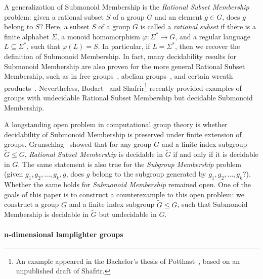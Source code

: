 \documentclass[a4paper,UKenglish,cleveref, autoref, thm-restate]{lipics-v2021}
\theoremstyle{definition}
\theoremstyle{definition}
\theoremstyle{definition}
\begin{document}
A generalization of Submonoid Membership is the \emph{Rational Subset Membership} problem: given a rational subset $S$ of a group $G$ and an element $g \in G$, does $g$ belong to $S$?
Here, a subset $S$ of a group $G$ is called a \emph{rational subset} if there is a finite alphabet $\Sigma$, a monoid homomorphism $\varphi \colon \Sigma^* \rightarrow G$, and a regular language $L \subseteq \Sigma^*$, such that $\varphi(L) = S$.
In particular, if $L = \Sigma^*$, then we recover the definition of Submonoid Membership.
In fact, many decidability results for Submonoid Membership are also proven for the more general Rational Subset Membership, such as in free groups~\cite{benois1969parties}, abelian groups~\cite{grunschlag1999algorithms}, and certain wreath products~\cite{lohrey2015rational}.
Nevertheless, Bodart~\cite{bodart2024membership} and Shafrir\footnote{An example appeared in the Bachelor's thesis of Potthast~\cite{potthast2020submonoid}, based on an unpublished draft of Shafrir.} recently provided examples of groups with undecidable Rational Subset Membership but decidable Submonoid Membership.

A longstanding open problem in computational group theory is whether decidability of Submonoid Membership is preserved under finite extension of groups.
Grunschlag~\cite{grunschlag1999algorithms} showed that for any group $G$ and a finite index subgroup $\widetilde{G} \leq G$, \emph{Rational Subset Membership} is decidable in $\widetilde{G}$ if and only if it is decidable in $G$.
The same statement is also true for the \emph{Subgroup Membership} problem~\cite{grunschlag1999algorithms} (given $g_1, g_2, \ldots, g_{k}, g$, does $g$ belong to the subgroup generated by $g_1, g_2, \ldots, g_{k}$?).
Whether the same holds for \emph{Submonoid Membership} remained open.
One of the goals of this paper is to construct a counterexample to this open problem: we construct a group $G$ and a finite index subgroup $\widetilde{G} \leq G$, such that Submonoid Membership is decidable in $\widetilde{G}$ but undecidable in $G$.

\paragraph*{n-dimensional lamplighter groups}
\end{document}

